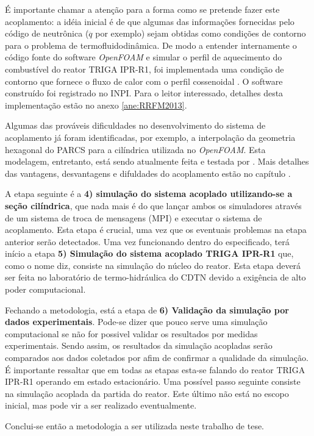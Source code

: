 \documentclass[12pt,openright,twoside,a4paper,english,french,spanish,brazil]{abntex2}
\begin{document}
É importante chamar a atenção para a forma como se pretende fazer este acoplamento: a idéia inicial é de que 
algumas das informações fornecidas pelo código de neutrônica ($\dddot{q}$ por exemplo) sejam obtidas como condições 
de contorno para o problema de termofluidodinâmica. De modo a entender internamente o código fonte do software 
\textit{OpenFOAM} e simular o perfil de aquecimento do combustível do reator TRIGA IPR-R1, foi implementada 
uma condição de contorno que fornece o fluxo de calor com o perfil cossenoidal \cite{Veloso2005}. O software 
construído foi registrado no INPI. Para o leitor interessado, detalhes desta implementação estão no anexo 
\ref{ane:RRFM2013}.

Algumas das prováveis dificuldades no desenvolvimento do sistema de acoplamento já foram identificadas, por exemplo, 
a interpolação da geometria hexagonal do PARCS para a cilíndrica utilizada no \textit{OpenFOAM}. Esta modelagem, 
entretanto, está sendo atualmente feita e testada por \cite{Reis2013}. Mais detalhes das vantagens, 
desvantagens e difuldades do acoplamento estão no capítulo .

A etapa seguinte é a \textbf{4) simulação do sistema acoplado utilizando-se a seção cilíndrica}, que nada mais é do que lançar 
ambos os simuladores através de um sistema de troca de mensagens (MPI) e executar o sistema de acoplamento. Esta etapa 
é crucial, uma vez que os eventuais problemas na etapa anterior serão detectados. Uma vez funcionando dentro do especificado, 
terá início a etapa \textbf{5) Simulação do sistema acoplado TRIGA IPR-R1} que, como o nome diz, consiste na simulação 
do núcleo do reator. Esta etapa deverá ser feita no laboratório de termo-hidráulica do CDTN devido a exigência de 
alto poder computacional.

Fechando a metodologia, está a etapa de \textbf{6) Validação da simulação por dados experimentais}. Pode-se dizer que 
pouco serve uma simulação computacional se não for possivel validar os resultados por medidas experimentais. Sendo assim, 
os resultados da simulação acopladas serão comparados aos dados coletados por \cite{Mesquita2006} afim de confirmar a 
qualidade da simulação. É importante ressaltar que em todas as etapas esta-se falando do reator TRIGA IPR-R1 operando 
em estado estacionário. Uma possível passo seguinte consiste na simulação acoplada da partida do reator. Este último não 
está no escopo inicial, mas pode vir a ser realizado eventualmente.

Conclui-se então a metodologia a ser utilizada neste trabalho de tese.
\end{document}
